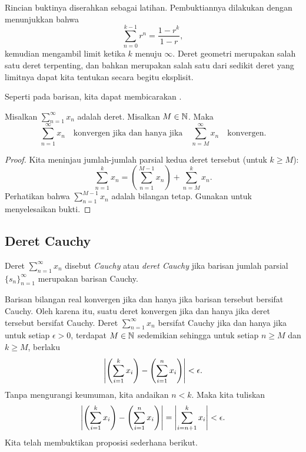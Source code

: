 Rincian buktinya diserahkan sebagai latihan.
Pembuktiannya dilakukan dengan menunjukkan bahwa 
\begin{equation*}
\sum_{n=0}^{k-1} r^n = \frac{1-r^k}{1-r} ,
\end{equation*}
kemudian mengambil limit ketika $k$ menuju $\infty$.
Deret geometri merupakan salah satu deret terpenting, dan bahkan merupakan
salah satu dari sedikit deret yang limitnya dapat kita tentukan secara begitu eksplisit.

\medskip

\pagebreak[2]
Seperti pada barisan, kita dapat membicarakan \emph{}.

\begin{prop}
Misalkan $\sum_{n=1}^\infty x_n$ adalah deret.  Misalkan $M \in {\mathbb{N}}$.  Maka
\begin{equation*}
\sum_{n=1}^\infty x_n \quad \text{konvergen jika dan hanya jika} \quad
\sum_{n=M}^\infty x_n \quad \text{konvergen.}
\end{equation*}
\end{prop}

\begin{proof}
Kita meninjau jumlah-jumlah parsial kedua deret tersebut (untuk $k \geq M$):
\begin{equation*}
\sum_{n=1}^{k} x_n
=
\left(
\sum_{n=1}^{M-1} x_n
\right)
+
\sum_{n=M}^{k} x_n .
\end{equation*}
Perhatikan bahwa 
$\sum_{n=1}^{M-1} x_n$ adalah bilangan tetap.  Gunakan
 untuk menyelesaikan bukti.
\end{proof}

\subsection{Deret Cauchy}

\begin{defn}
Deret $\sum_{n=1}^\infty x_n$ disebut \emph{Cauchy} atau
\emph{deret Cauchy}
jika barisan jumlah parsial $\{ s_n \}_{n=1}^\infty$ merupakan barisan Cauchy.
\end{defn}

Barisan bilangan real konvergen jika dan hanya jika barisan tersebut
bersifat Cauchy.  Oleh karena itu, suatu deret konvergen jika dan hanya jika deret tersebut bersifat Cauchy.
Deret $\sum_{n=1}^\infty x_n$ bersifat Cauchy jika dan hanya jika untuk setiap $\epsilon > 0$,
terdapat $M \in {\mathbb{N}}$ sedemikian sehingga untuk setiap $n \geq M$
dan $k \geq M$, berlaku
\begin{equation*}
\left\lvert { \left( \sum_{i=1}^k x_i \right) - \left( \sum_{i=1}^n x_i \right) } \right\rvert
< \epsilon .
\end{equation*}
Tanpa mengurangi keumuman, kita andaikan $n < k$.  Maka kita tuliskan
\begin{equation*}
\left\lvert { \left( \sum_{i=1}^k x_i \right) - \left( \sum_{i=1}^n x_i \right) } \right\rvert
=
\left\lvert { \sum_{i={n+1}}^k x_i } \right\rvert
< \epsilon .
\end{equation*}
Kita telah membuktikan proposisi sederhana berikut.

